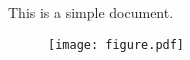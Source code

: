 \documentclass{article}
\begin{document}
This is a simple document.

\begin{figure}
    \texttt{[image: figure.pdf]}
\end{figure}
\end{document}
